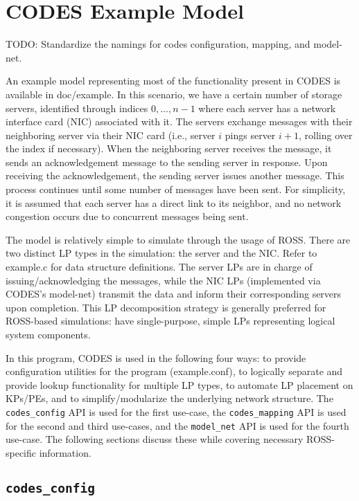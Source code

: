 \documentclass[conference,10pt,compsocconf,onecolumn]{IEEEtran}
\newcommand{\codesmapping}[1]{\texttt{codes\_mapping}}
\newcommand{\codesconfig}[1]{\texttt{codes\_config}}
\newcommand{\codesmodelnet}[1]{\texttt{model\_net}}
\begin{document}
\section{CODES Example Model}

TODO: Standardize the namings for codes configuration, mapping, and model-net.

An example model representing most of the functionality present in CODES is
available in doc/example. In
this scenario, we have a certain number of storage servers, identified
through indices $0,\ldots, n-1$ where each server has a network interface card
(NIC) associated with it. The servers exchange messages with their neighboring
server via their NIC card (i.e., server $i$ pings server $i+1$, rolling over the
index if necessary). When the neighboring server receives the message, it sends
an acknowledgement message to the sending server in response. Upon receiving the
acknowledgement, the sending server issues another message. This process continues until
some number of messages have been sent. For simplicity, it is assumed that each
server has a direct link to its neighbor, and no network congestion occurs due
to concurrent messages being sent.

The model is relatively simple to simulate through the usage of ROSS. There are
two distinct LP types in the simulation: the server and the NIC. Refer to
example.c for data structure definitions. The server LPs
are in charge of issuing/acknowledging the messages, while the NIC LPs
(implemented via CODES's model-net) transmit the data and inform their
corresponding servers upon completion. This LP decomposition strategy is
generally preferred for ROSS-based simulations: have single-purpose, simple LPs
representing logical system components.

In this program, CODES is used in the following four ways: to provide
configuration utilities for the program (example.conf), to logically separate and provide
lookup functionality for multiple LP types, to automate LP placement on KPs/PEs,
and to simplify/modularize the underlying network structure. The \codesconfig{}
API is used for the first use-case, the \codesmapping{} API is used for
the second and third use-cases, and the \codesmodelnet{} API is used for the
fourth use-case. The following sections discuss these while covering necessary
ROSS-specific information.

\subsection{\codesconfig{}}
\end{document}
